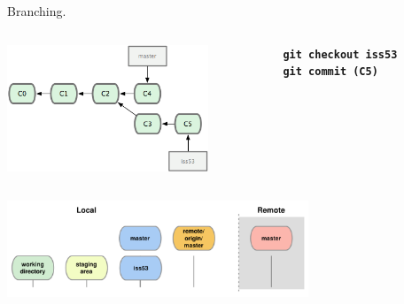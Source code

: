 \documentclass{beamer}
\begin{document}
\begin{frame}{Branching.}
  \begin{columns}
    \begin{column}{0.6\linewidth}
      \begin{center}
        \includegraphics[width=6cm]{UniBo.IDSEPC.A2022.LavoroCondiviso/18333fig0315-tn}
      \end{center}
    \end{column}
    \begin{column}{0.4\linewidth}
      \begin{center}
        \texttt{\textbf{git checkout iss53}}\\
        \texttt{\textbf{git commit (C5)}}
      \end{center}
    \end{column}
  \end{columns}
  \begin{center}
    \includegraphics[width=9cm]{UniBo.IDSEPC.A2022.LavoroCondiviso/git-checkout}
  \end{center}
\end{frame}
\end{document}
